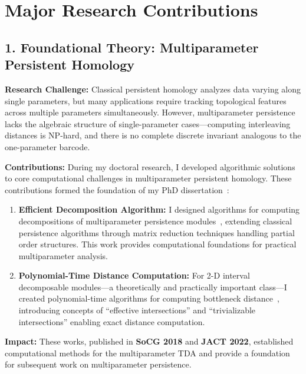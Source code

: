 \documentclass[11pt,letterpaper]{article}
\begin{document}
\vspace{-0.1in}
\section*{Major Research Contributions}


\subsection*{1. Foundational Theory: Multiparameter Persistent Homology}



\textbf{Research Challenge:} Classical persistent homology analyzes data varying along single parameters, but many applications require tracking topological features across multiple parameters simultaneously. However, multiparameter persistence lacks the algebraic structure of single-parameter cases—computing interleaving distances is NP-hard, and there is no complete discrete invariant analogous to the one-parameter barcode.

\textbf{Contributions:} During my doctoral research, I developed algorithmic solutions to core computational challenges in multiparameter persistent homology. These contributions formed the foundation of my PhD dissertation~\cite{xin2023decomposition}:

\begin{enumerate}
    \item \textbf{Efficient Decomposition Algorithm:} I designed algorithms for computing decompositions of multiparameter persistence modules~\cite{dey2021generalized}, extending classical persistence algorithms through matrix reduction techniques handling partial order structures. This work provides computational foundations for practical multiparameter analysis.
    \item \textbf{Polynomial-Time Distance Computation:} For 2-D interval decomposable modules—a theoretically and practically important class—I created polynomial-time algorithms for computing bottleneck distance~\cite{xin2018}, introducing concepts of ``effective intersections'' and ``trivializable intersections'' enabling exact distance computation.
\end{enumerate}

\textbf{Impact:} These works, published in \textbf{SoCG 2018} and \textbf{JACT 2022}, established computational methods for the multiparameter TDA and provide a foundation for subsequent work on multiparameter persistence.
\end{document}
